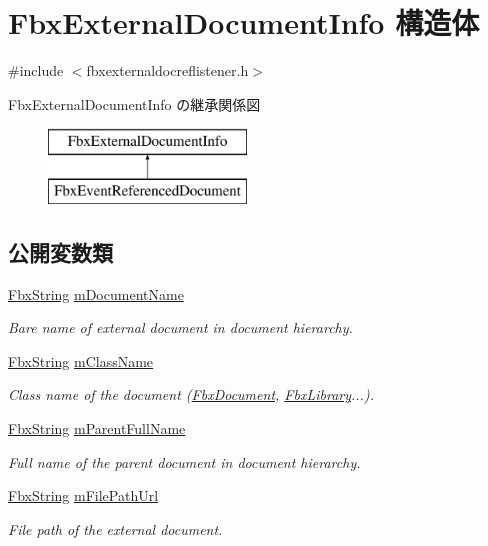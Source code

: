 \hypertarget{struct_fbx_external_document_info}{}\section{Fbx\+External\+Document\+Info 構造体}
\label{struct_fbx_external_document_info}


{\ttfamily \#include $<$fbxexternaldocreflistener.\+h$>$}

Fbx\+External\+Document\+Info の継承関係図\begin{figure}[H]
\begin{center}
\leavevmode
\includegraphics[height=2.000000cm]{struct_fbx_external_document_info}
\end{center}
\end{figure}
\subsection*{公開変数類}
\begin{DoxyCompactItemize}
\item 
\hyperlink{class_fbx_string}{Fbx\+String} \hyperlink{struct_fbx_external_document_info_a3744e27dd1ba48aa66b36c7e896cde89}{m\+Document\+Name}
\begin{DoxyCompactList}\small\item\em Bare name of external document in document hierarchy. \end{DoxyCompactList}\item 
\hyperlink{class_fbx_string}{Fbx\+String} \hyperlink{struct_fbx_external_document_info_a0dcde2cfd81d268f174c54c7eed46b8b}{m\+Class\+Name}
\begin{DoxyCompactList}\small\item\em Class name of the document (\hyperlink{class_fbx_document}{Fbx\+Document}, \hyperlink{class_fbx_library}{Fbx\+Library}...). \end{DoxyCompactList}\item 
\hyperlink{class_fbx_string}{Fbx\+String} \hyperlink{struct_fbx_external_document_info_ae677004de679e0106dcfea163f36079c}{m\+Parent\+Full\+Name}
\begin{DoxyCompactList}\small\item\em Full name of the parent document in document hierarchy. \end{DoxyCompactList}\item 
\hyperlink{class_fbx_string}{Fbx\+String} \hyperlink{struct_fbx_external_document_info_a65b555c9b2dc44bc63d65b3ae2c24cac}{m\+File\+Path\+Url}
\begin{DoxyCompactList}\small\item\em File path of the external document. \end{DoxyCompactList}\end{DoxyCompactItemize}


